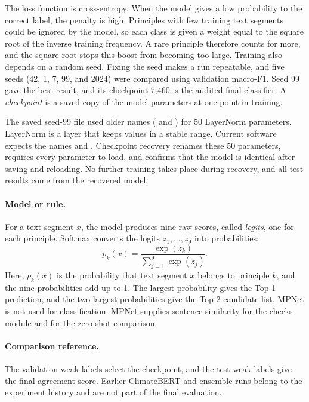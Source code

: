 The loss function is cross-entropy. When the model gives a low probability to the correct label, the penalty is high. Principles with few training text segments could be ignored by the model, so each class is given a weight equal to the square root of the inverse training frequency. A rare principle therefore counts for more, and the square root stops this boost from becoming too large. Training also depends on a random seed. Fixing the seed makes a run repeatable, and five seeds (42, 1, 7, 99, and 2024) were compared using validation macro-F1. Seed 99 gave the best result, and its checkpoint 7,460 is the audited final classifier. A \emph{checkpoint} is a saved copy of the model parameters at one point in training.

The saved seed-99 file used older names ( and ) for 50 LayerNorm parameters. LayerNorm is a layer that keeps values in a stable range. Current software expects the names  and . Checkpoint recovery renames these 50 parameters, requires every parameter to load, and confirms that the model is identical after saving and reloading. No further training takes place during recovery, and all test results come from the recovered model.

\paragraph{Model or rule.} For a text segment $x$, the model produces nine raw scores, called \emph{logits}, one for each principle. Softmax converts the logits $z_1,\dots,z_9$ into probabilities:
\begin{equation}
p_k(x)=\frac{\exp(z_k)}{\sum_{j=1}^{9}\exp(z_j)}.
\label{eq:softmax}
\end{equation}
Here, $p_k(x)$ is the probability that text segment $x$ belongs to principle $k$, and the nine probabilities add up to 1. The largest probability gives the Top-1 prediction, and the two largest probabilities give the Top-2 candidate list. MPNet is not used for classification. MPNet supplies sentence similarity for the checks module and for the zero-shot comparison.

\paragraph{Comparison reference.} The validation weak labels select the checkpoint, and the test weak labels give the final agreement score. Earlier ClimateBERT and ensemble runs belong to the experiment history and are not part of the final evaluation.

